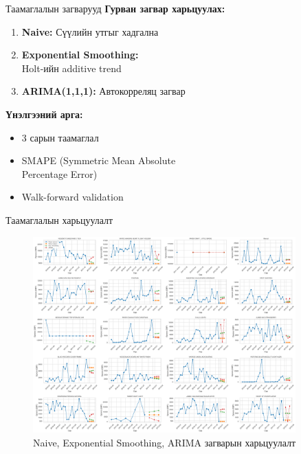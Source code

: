 \documentclass{beamer}
\begin{document}
\begin{frame}{Таамаглалын загварууд}
\small
\textbf{Гурван загвар харьцуулах:}
\begin{enumerate}
    \item \textbf{Naive:} Сүүлийн утгыг хадгална
    \item \textbf{Exponential Smoothing:}\\Holt-ийн additive trend
    \item \textbf{ARIMA(1,1,1):} Автокорреляц загвар
\end{enumerate}

\vspace{0.2cm}
\textbf{Үнэлгээний арга:}
\begin{itemize}
    \item 3 сарын таамаглал
    \item SMAPE (Symmetric Mean Absolute\\Percentage Error)
    \item Walk-forward validation
\end{itemize}
\end{frame}

\begin{frame}{Таамаглалын харьцуулалт}
\begin{figure}
    \centering
    \includegraphics[width=0.9\textwidth]{top20_forecast_comparison.png}
    \caption{Naive, Exponential Smoothing, ARIMA загварын харьцуулалт}
\end{figure}
\end{frame}
\end{document}
